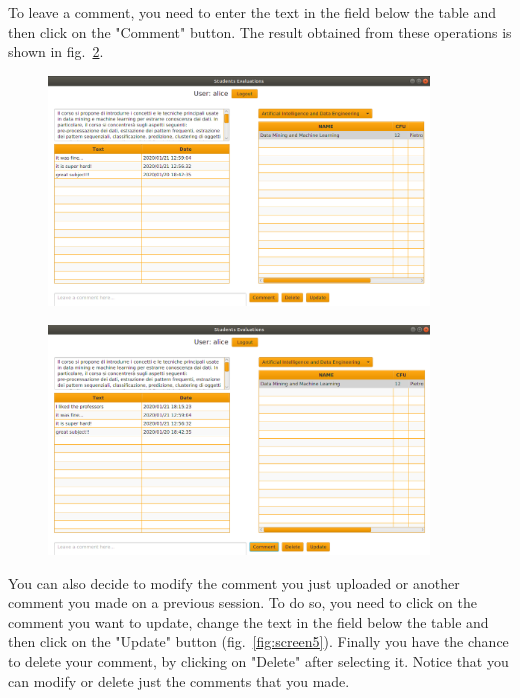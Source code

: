 \documentclass[a4paper]{article}
\begin{document}
To leave a comment, you need to enter the text in the field below the table and then click on the "Comment" button. The result obtained from these operations is shown in fig.~\ref{fig:screen4}.

\begin{figure}
\centering
\includegraphics[width=0.9\textwidth]{images/screens/screen3}
\label{fig:screen3}
\end{figure}

\begin{figure}
\centering
\includegraphics[width=0.9\textwidth]{images/screens/screen4}
\label{fig:screen4}
\end{figure}

You can also decide to modify the comment you just uploaded or another comment you made on a previous session. To do so, you need to click on the comment you want to update, change the text in the field below the table and then click on the "Update" button (fig.~\ref{fig:screen5}).
Finally you have the chance to delete your comment, by clicking on "Delete" after selecting it. Notice that you can modify or delete just the comments that you made.
\end{document}
